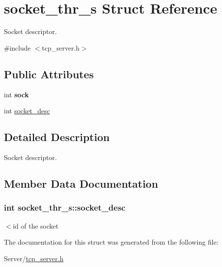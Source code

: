 \hypertarget{structsocket__thr__s}{}\section{socket\+\_\+thr\+\_\+s Struct Reference}
\label{structsocket__thr__s}


Socket descriptor.  




{\ttfamily \#include $<$tcp\+\_\+server.\+h$>$}

\subsection*{Public Attributes}
\begin{DoxyCompactItemize}
\item 
int {\bfseries sock}\hypertarget{structsocket__thr__s_aebe7f7eaea86ba1058a110e5b78c9588}{}\label{structsocket__thr__s_aebe7f7eaea86ba1058a110e5b78c9588}

\item 
int \hyperlink{structsocket__thr__s_a8ddff7bf6cebb0a6f077283b45b21b5f}{socket\+\_\+desc}
\end{DoxyCompactItemize}


\subsection{Detailed Description}
Socket descriptor. 

\subsection{Member Data Documentation}
\subsubsection[{\texorpdfstring{socket\+\_\+desc}{socket_desc}}]{\setlength{\rightskip}{0pt plus 5cm}int socket\+\_\+thr\+\_\+s\+::socket\+\_\+desc}\hypertarget{structsocket__thr__s_a8ddff7bf6cebb0a6f077283b45b21b5f}{}\label{structsocket__thr__s_a8ddff7bf6cebb0a6f077283b45b21b5f}
$<$id of the socket 

The documentation for this struct was generated from the following file\+:\begin{DoxyCompactItemize}
\item 
Server/\hyperlink{tcp__server_8h}{tcp\+\_\+server.\+h}\end{DoxyCompactItemize}
